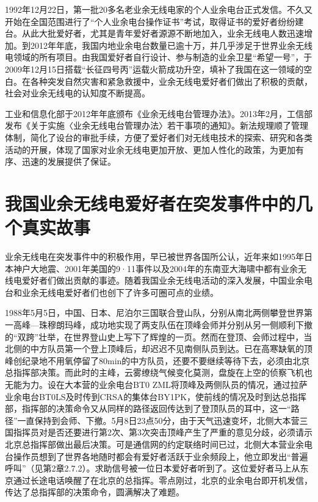 \documentclass[12pt,UTF8]{ctexbook}
\begin{document}
1992年12月22日，第一批20多名老业余无线电家的个人业余电台正式发信。不久又开始在全国范围进行了“个人业余电台操作证书”考试，取得证书的爱好者纷纷建台。从此大批爱好者，尤其是青年爱好者源源不断地加入，业余无线电人数迅速增加。到2012年年底，我国内地业余电台数量已逾十万，并几乎涉足于世界业余无线电领域的所有项目。由我国爱好者自行设计、参与制造的业余卫星“希望一号”，于2009年12月15日搭载“长征四号丙”运载火箭成功升空，填补了我国在这一领域的空白。在各种突发自然灾害和紧急救援中，业余无线电爱好者们做出了积极的贡献，社会对业余无线电的认知度不断提高。

工业和信息化部于2012年年底颁布《业余无线电台管理办法》。2013年2月，工信部发布《关于实施〈业余无线电台管理办法〉若干事项的通知》。新法规理顺了管理体制，简化了设台的审批手续，方便了爱好者们对无线电技术的探索、研究和各类活动的开展，体现了国家对业余无线电更加开放、更加人性化的政策，为更加有序、迅速的发展提供了保证。

\section{我国业余无线电爱好者在突发事件中的几个真实故事}

业余无线电在突发事件中的积极作用，早已被世界各国所公认，近年来如1995年日本神户大地震、2001年美国的9·11事件以及2004年的东南亚大海啸中都有业余无线电爱好者们做出贡献的事迹。随着我国业余无线电活动的深入发展，中国业余电台和业余无线电爱好者们也创下了许多可圈可点的业绩。

1988年5月5日，中国、日本、尼泊尔三国联合登山队，分别从南北两侧攀登世界第一高峰—珠穆朗玛峰，成功地实现了两支队伍在顶峰会师并分别从另一侧顺利下撤的“双跨”壮举，在世界登山史上写下了辉煌的一页。然而在登顶、会师过程中，当北侧的中方队员第一个登上顶峰后，却迟迟不见南侧队员到达。已在高寒缺氧的顶峰创纪录地不用氧停留了80min的中方队员，还要不要继续等待下去，必须由北京总指挥部决策。而此时的主峰，云雾缭绕气候变化莫测，盘旋在上空的侦察飞机也无能为力。设在大本营的业余电台BT0 ZML将顶峰及两侧队员的情况，通过拉萨业余电台BT0LS及时传到CRSA的集体台BY1PK，使前线的情况及时到达总指挥部，指挥部的决策命令又从同样的路径返回传达到了登顶队员的耳中，这一“路径”一直保持到会师、下撤。5月8日23点50分，由于天气迅速变坏，北侧大本营三国指挥员对是否还要进行第2次、第3次突击顶峰产生了严重的意见分歧，必须请示北京总指挥部做出最后决策。可是通信网的约定联络时间已过，北侧大本营业余电台操作员想到了世界各地随时都会有爱好者活跃于业余频段上，他立即发出“普遍呼叫”（见第2章2.7.2）。求助信号被一位日本爱好者听到了。这位爱好者马上从东京通过长途电话唤醒了在北京的总指挥。零点刚过，北京的业余电台即开机发信，传达了总指挥部的决策命令，圆满解决了难题。
\end{document}
